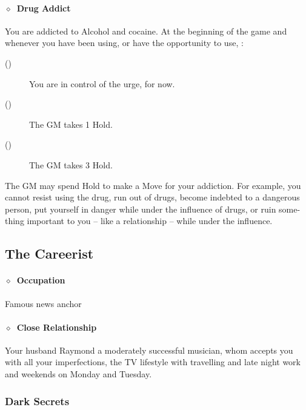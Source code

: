 \paragraph{\(\diamond\)~Drug Addict}%
You are addicted to Alcohol and cocaine. At the beginning of the game and whenever you have
been using, or have the opportunity to use, :
\begin{description}
 \item[()] You are in control of the urge, for now.
 \item[()] The GM takes 1 Hold.
 \item[()] The GM takes 3 Hold.
\end{description}
The GM may spend Hold to make a Move for your addiction. For example, you cannot resist using the
drug, run out of drugs, become indebted to a dangerous person, put yourself in danger while under
the influence of drugs, or ruin some-thing important to you – like a relationship – while under
the influence.
\KULTrule%

\clearpage %
\subsection{The Careerist}%
\label{sub:the_careerist}

\paragraph{\(\diamond\)~Occupation}%
Famous news anchor
\paragraph{\(\diamond\)~Close Relationship}%
Your husband Raymond a moderately successful musician, whom accepts you with all your imperfections, the TV lifestyle with travelling and late night work and weekends on Monday and Tuesday.


\subsubsection{Dark Secrets}%
\label{ssub:careerist_dark_secrets}

